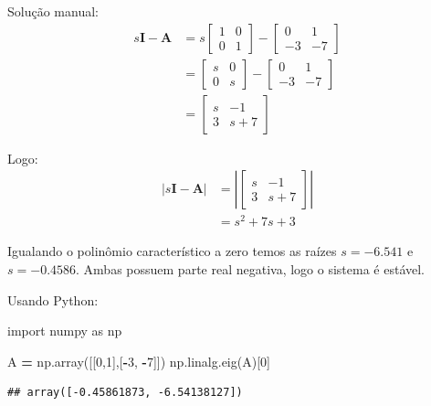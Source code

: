 \documentclass[
]{book}
\newenvironment{Shaded}{\begin{snugshade}}{\end{snugshade}}
\newcommand{\DecValTok}[1]{\textcolor[rgb]{0.00,0.00,0.81}{#1}}
\newcommand{\ImportTok}[1]{#1}
\newcommand{\NormalTok}[1]{#1}
\newcommand{\OperatorTok}[1]{\textcolor[rgb]{0.81,0.36,0.00}{\textbf{#1}}}
\begin{document}
Solução manual:
\begin{align}
  s\mathbf{I-A} &=  s \left[\begin{matrix}1 & 0\\0 & 1\end{matrix}\right] -  \left[\begin{matrix}0 & 1\\-3 & -7\end{matrix}\right] \\
  &=  \left[\begin{matrix}s & 0\\0 & s\end{matrix}\right] - \left[\begin{matrix}0 & 1\\-3 & -7\end{matrix}\right] \\
  &=  \left[\begin{matrix}s & -1\\3 & s + 7\end{matrix}\right] 
\end{align}

Logo:
\begin{align}
  |s\mathbf{I-A}| &= \left| \left[\begin{matrix}s & -1\\3 & s + 7\end{matrix}\right] \right|\\
  &= s^{2} + 7 s + 3
\end{align}

Igualando o polinômio característico a zero temos as raízes \(s = -6.541\) e \(s = -0.4586\). Ambas possuem parte real negativa, logo o sistema é estável.

Usando Python:

\begin{Shaded}
\begin{Highlighting}[]
\ImportTok{import}\NormalTok{ numpy }\ImportTok{as}\NormalTok{ np}

\NormalTok{A }\OperatorTok{=}\NormalTok{ np.array([[}\DecValTok{0}\NormalTok{,}\DecValTok{1}\NormalTok{],[}\OperatorTok{{-}}\DecValTok{3}\NormalTok{, }\OperatorTok{{-}}\DecValTok{7}\NormalTok{]])}
\NormalTok{np.linalg.eig(A)[}\DecValTok{0}\NormalTok{]}
\end{Highlighting}
\end{Shaded}

\begin{verbatim}
## array([-0.45861873, -6.54138127])
\end{verbatim}
\end{document}
